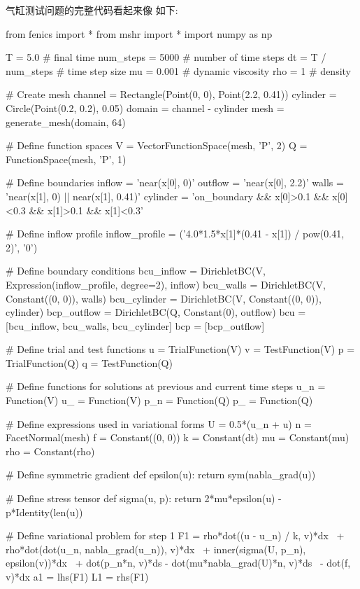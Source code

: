气缸测试问题的完整代码看起来像
如下:

\begin{python}
from fenics import *
from mshr import *
import numpy as np

T = 5.0            # final time
num_steps = 5000   # number of time steps
dt = T / num_steps # time step size
mu = 0.001         # dynamic viscosity
rho = 1            # density

# Create mesh
channel = Rectangle(Point(0, 0), Point(2.2, 0.41))
cylinder = Circle(Point(0.2, 0.2), 0.05)
domain = channel - cylinder
mesh = generate_mesh(domain, 64)

# Define function spaces
V = VectorFunctionSpace(mesh, 'P', 2)
Q = FunctionSpace(mesh, 'P', 1)

# Define boundaries
inflow   = 'near(x[0], 0)'
outflow  = 'near(x[0], 2.2)'
walls    = 'near(x[1], 0) || near(x[1], 0.41)'
cylinder = 'on_boundary && x[0]>0.1 && x[0]<0.3 && x[1]>0.1 && x[1]<0.3'

# Define inflow profile
inflow_profile = ('4.0*1.5*x[1]*(0.41 - x[1]) / pow(0.41, 2)', '0')

# Define boundary conditions
bcu_inflow = DirichletBC(V, Expression(inflow_profile, degree=2), inflow)
bcu_walls = DirichletBC(V, Constant((0, 0)), walls)
bcu_cylinder = DirichletBC(V, Constant((0, 0)), cylinder)
bcp_outflow = DirichletBC(Q, Constant(0), outflow)
bcu = [bcu_inflow, bcu_walls, bcu_cylinder]
bcp = [bcp_outflow]

# Define trial and test functions
u = TrialFunction(V)
v = TestFunction(V)
p = TrialFunction(Q)
q = TestFunction(Q)

# Define functions for solutions at previous and current time steps
u_n = Function(V)
u_  = Function(V)
p_n = Function(Q)
p_  = Function(Q)

# Define expressions used in variational forms
U  = 0.5*(u_n + u)
n  = FacetNormal(mesh)
f  = Constant((0, 0))
k  = Constant(dt)
mu = Constant(mu)
rho = Constant(rho)

# Define symmetric gradient
def epsilon(u):
    return sym(nabla_grad(u))

# Define stress tensor
def sigma(u, p):
    return 2*mu*epsilon(u) - p*Identity(len(u))

# Define variational problem for step 1
F1 = rho*dot((u - u_n) / k, v)*dx \
   + rho*dot(dot(u_n, nabla_grad(u_n)), v)*dx \
   + inner(sigma(U, p_n), epsilon(v))*dx \
   + dot(p_n*n, v)*ds - dot(mu*nabla_grad(U)*n, v)*ds \
   - dot(f, v)*dx
a1 = lhs(F1)
L1 = rhs(F1)


\end{python}
